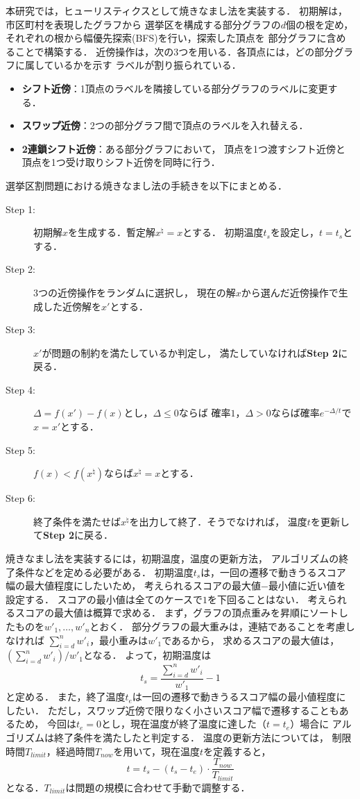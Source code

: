 \documentclass[10pt,a4paper,notitlepage,oneside,twocolumn]{abst_jsarticle}
\begin{document}
本研究では，ヒューリスティクスとして焼きなまし法を実装する．
初期解は，市区町村を表現したグラフから
選挙区を構成する部分グラフの$d$個の根を定め，
それぞれの根から幅優先探索(BFS)を行い，探索した頂点を
部分グラフに含めることで構築する．
近傍操作は，次の3つを用いる．各頂点には，どの部分グラフに属しているかを示す
ラベルが割り振られている．
\begin{itemize}
  \item \textbf{シフト近傍}：1頂点のラベルを隣接している部分グラフのラベルに変更する．
  \item \textbf{スワップ近傍}：2つの部分グラフ間で頂点のラベルを入れ替える．
  \item \textbf{2連鎖シフト近傍}：ある部分グラフにおいて，
  頂点を1つ渡すシフト近傍と頂点を1つ受け取りシフト近傍を同時に行う．
\end{itemize}

選挙区割問題における焼きなまし法の手続きを以下にまとめる．

\begin{description}
  \item[Step 1:] 初期解$x$を生成する．暫定解$x^{\natural}=x$とする．
  初期温度$t_s$を設定し，$t=t_s$とする．
  \item[Step 2:] 3つの近傍操作をランダムに選択し，
  現在の解$x$から選んだ近傍操作で生成した近傍解を$x'$とする．
  \item[Step 3:] $x'$が問題の制約を満たしているか判定し，
  満たしていなければ\textbf{Step 2}に戻る．
  \item[Step 4:] $\Delta=f(x')-f(x)$とし，$\Delta \leq 0$ならば
  確率$1$，$\Delta > 0$ならば確率$e^{-\Delta/t}$で$x=x'$とする．
  \item[Step 5:] $f(x)<f(x^{\natural})$ならば$x^{\natural}=x$とする．
  \item[Step 6:] 終了条件を満たせば$x^{\natural}$を出力して終了．そうでなければ，
  温度$t$を更新して\textbf{Step 2}に戻る．
\end{description}

焼きなまし法を実装するには，初期温度，温度の更新方法，
アルゴリズムの終了条件などを定める必要がある．
初期温度$t_{s}$は，一回の遷移で動きうるスコア幅の最大値程度にしたいため，
考えられるスコアの最大値$-$最小値に近い値を設定する．
スコアの最小値は全てのケースで$1$を下回ることはない．
考えられるスコアの最大値は概算で求める．
まず，グラフの頂点重みを昇順にソートしたものを$w'_1,\ldots,w'_n$とおく．
部分グラフの最大重みは，連結であることを考慮しなければ
$\sum_{i=d}^n w'_i$，最小重みは$w'_1$であるから，
求めるスコアの最大値は，$(\sum_{i=d}^n w'_i)/w'_1$となる．
よって，初期温度は$$t_s=\frac{\sum_{i=d}^n w'_i}{w'_1}- 1$$と定める．
また，終了温度$t_e$は一回の遷移で動きうるスコア幅の最小値程度にしたい．
ただし，スワップ近傍で限りなく小さいスコア幅で遷移することもあるため，
今回は$t_e=0$とし，現在温度が終了温度に達した（$t=t_e$）場合に
アルゴリズムは終了条件を満たしたと判定する．
温度の更新方法については，
制限時間$T_{limit}$，経過時間$T_{now}$を用いて，現在温度$t$を定義すると，
$$t=t_s - (t_s - t_e)\cdot \frac{T_{now}}{T_{limit}}$$
となる．$T_{limit}$は問題の規模に合わせて手動で調整する．
\end{document}
